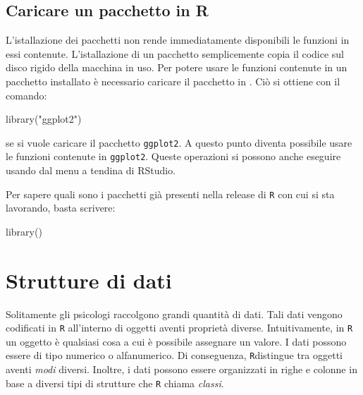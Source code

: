 \documentclass[
]{memoir}
\newenvironment{Shaded}{\begin{snugshade}}{\end{snugshade}}
\newcommand{\FunctionTok}[1]{\textcolor[rgb]{0.00,0.00,0.00}{#1}}
\newcommand{\NormalTok}[1]{#1}
\newcommand{\StringTok}[1]{\textcolor[rgb]{0.31,0.60,0.02}{#1}}
\theoremstyle{definition}
\theoremstyle{definition}
\theoremstyle{definition}
\theoremstyle{definition}
\theoremstyle{remark}
\begin{document}
\hypertarget{caricare-un-pacchetto-in-r}{%
\subsection{Caricare un pacchetto in R}\label{caricare-un-pacchetto-in-r}}

L'istallazione dei pacchetti non rende immediatamente disponibili le
funzioni in essi contenute. L'istallazione di un pacchetto semplicemente
copia il codice sul disco rigido della macchina in uso. Per potere usare
le funzioni contenute in un pacchetto installato è necessario caricare
il pacchetto in . Ciò si ottiene con il comando:

\begin{Shaded}
\begin{Highlighting}[]
\FunctionTok{library}\NormalTok{(}\StringTok{"ggplot2"}\NormalTok{)}
\end{Highlighting}
\end{Shaded}

se si vuole caricare il pacchetto \texttt{ggplot2}. A questo punto diventa
possibile usare le funzioni contenute in \texttt{ggplot2}. Queste operazioni si
possono anche eseguire usando dal menu a tendina di RStudio.

Per sapere quali sono i pacchetti già presenti nella release di \texttt{R} con
cui si sta lavorando, basta scrivere:

\begin{Shaded}
\begin{Highlighting}[]
\FunctionTok{library}\NormalTok{()}
\end{Highlighting}
\end{Shaded}

\hypertarget{chapter-strutture-dati}{%
\section{Strutture di dati}\label{chapter-strutture-dati}}

Solitamente gli psicologi raccolgono grandi quantità di dati. Tali dati
vengono codificati in \texttt{R} all'interno di oggetti aventi proprietà
diverse. Intuitivamente, in \texttt{R} un oggetto è qualsiasi cosa a cui è
possibile assegnare un valore. I dati possono essere di tipo numerico o
alfanumerico. Di conseguenza, \texttt{R}distingue tra oggetti aventi \emph{modi}
diversi. Inoltre, i dati possono essere organizzati in righe e colonne
in base a diversi tipi di strutture che \texttt{R} chiama \emph{classi}.
\end{document}
